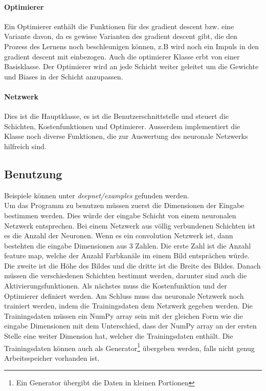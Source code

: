 \documentclass[12pt,a4paper]{report}
\begin{document}
\paragraph{Optimierer}
Ein Optimierer enthält die Funktionen für des gradient descent bzw. eine Variante davon,
da es gewisse Varianten des gradient descent gibt, die den Prozess des Lernens noch beschleunigen können,
z.B wird noch ein Impuls in den gradient descent mit einbezogen\cite{optimization}.
Auch die optimierer Klasse erbt von einer Basisklasse.
Der Optimierer wird an jede Schicht weiter geleitet um die Gewichte und Biases in der Schicht anzupassen.
\paragraph{Netzwerk}
Dies ist die Hauptklasse, es ist die Benutzerschnittstelle und
steuert die Schichten, Kostenfunktionen und Optimierer.
Ausserdem implementiert die Klasse noch diverse Funktionen, die zur Auswertung des neuronale Netzwerks hilfreich sind.

\subsection{Benutzung}
Beispiele können unter \textit{deepnet/examples} gefunden werden.\bigskip\\
Um das Programm zu benutzen müssen zuerst die Dimensionen der Eingabe bestimmen werden.
Dies würde der eingabe Schicht von einem neuronalen Netzwerk entsprechen.
Bei einem Netzwerk aus völlig verbundenen Schichten ist es die Anzahl der Neuronen.
Wenn es ein convolution Netzwerk ist, dann bestehten die eingabe Dimensionen aus 3 Zahlen.
Die erste Zahl ist die Anzahl feature map, welche der Anzahl Farbkanäle im einem Bild entsprächen würde.
Die zweite ist die Höhe des Bildes und die dritte ist die Breite des Bildes.
Danach müssen die verschiedenen Schichten bestimmt werden, darunter sind auch die Aktivierungsfunktionen.
Als nächstes muss die Kostenfunktion und der Optimierer definiert werden.
Am Schluss muss das neuronale Netzwerk noch trainiert werden, indem die Trainingsdaten dem Netzwerk gegeben werden.
Die Trainingsdaten müssen ein NumPy array sein mit der gleichen Form wie die eingabe Dimensionen mit dem Unterschied,
dass der NumPy array an der ersten Stelle eine weiter Dimension hat, welcher die Trainingsdaten enthält.
Die Trainingsdaten können auch als Generator\footnote{Ein Generator übergibt die Daten in kleinen Portionen} übergeben werden,
falls nicht genug Arbeitsspeicher vorhanden ist.
\end{document}
